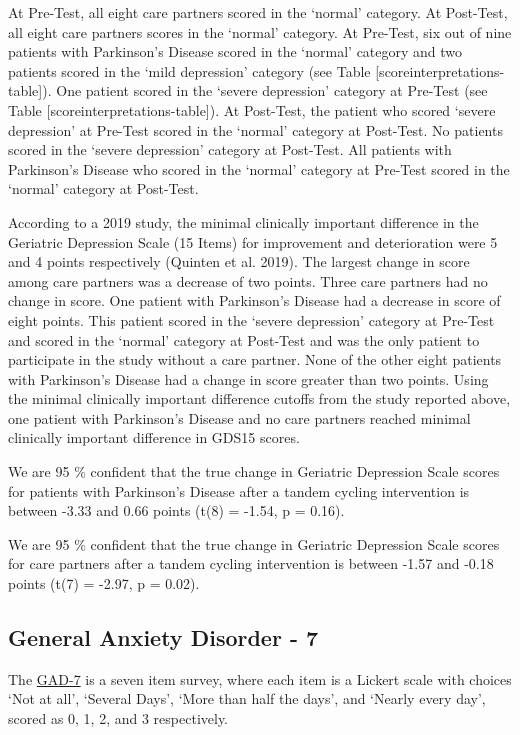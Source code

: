 \documentclass[
]{article}
\begin{document}
At Pre-Test, all eight care partners scored in the `normal' category. At
Post-Test, all eight care partners scores in the `normal' category. At
Pre-Test, six out of nine patients with Parkinson's Disease scored in
the `normal' category and two patients scored in the `mild depression'
category (see Table {[}scoreinterpretations-table{]}). One patient
scored in the `severe depression' category at Pre-Test (see Table
{[}scoreinterpretations-table{]}). At Post-Test, the patient who scored
`severe depression' at Pre-Test scored in the `normal' category at
Post-Test. No patients scored in the `severe depression' category at
Post-Test. All patients with Parkinson's Disease who scored in the
`normal' category at Pre-Test scored in the `normal' category at
Post-Test.

According to a 2019 study, the minimal clinically important difference
in the Geriatric Depression Scale (15 Items) for improvement and
deterioration were 5 and 4 points respectively (Quinten et al. 2019).
The largest change in score among care partners was a decrease of two
points. Three care partners had no change in score. One patient with
Parkinson's Disease had a decrease in score of eight points. This
patient scored in the `severe depression' category at Pre-Test and
scored in the `normal' category at Post-Test and was the only patient to
participate in the study without a care partner. None of the other eight
patients with Parkinson's Disease had a change in score greater than two
points. Using the minimal clinically important difference cutoffs from
the study reported above, one patient with Parkinson's Disease and no
care partners reached minimal clinically important difference in GDS15
scores.

We are 95 \(\%\) confident that the true change in Geriatric Depression
Scale scores for patients with Parkinson's Disease after a tandem
cycling intervention is between -3.33 and 0.66 points (t(8) = -1.54, p =
0.16).

We are 95 \(\%\) confident that the true change in Geriatric Depression
Scale scores for care partners after a tandem cycling intervention is
between -1.57 and -0.18 points (t(7) = -2.97, p = 0.02).

\hypertarget{general-anxiety-disorder---7}{%
\subsection{General Anxiety Disorder -
7}\label{general-anxiety-disorder---7}}

The
\href{https://www.hiv.uw.edu/page/mental-health-screening/gad-7\#:~:text=Score\%200\%2D4\%3A\%20Minimal\%20Anxiety,greater\%20than\%2015\%3A\%20Severe\%20Anxiety}{GAD-7}
is a seven item survey, where each item is a Lickert scale with choices
`Not at all', `Several Days', `More than half the days', and `Nearly
every day', scored as 0, 1, 2, and 3 respectively.
\end{document}
